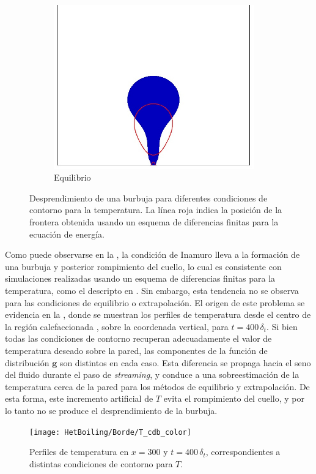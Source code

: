 \begin{figure}[htb]
    \begin{subfigure}[t]{0.45\textwidth}
        \centering
        \includegraphics[width=0.95\textwidth]{Imagenes/HetBoiling/Borde/density_equilibrium_fd}
        \caption{Equilibrio}
    \end{subfigure}    
    \caption{Desprendimiento de una burbuja para diferentes condiciones de contorno para la temperatura. La l\'inea roja indica la posici\'on de la frontera obtenida usando un esquema de diferencias finitas para la ecuaci\'on de energ\'ia.}
    \label{fig:bubble2D_bnd}
\end{figure}

Como puede observarse en la , la condici\'on de Inamuro lleva a la formaci\'on de una burbuja y posterior rompimiento del cuello, lo cual es consistente con simulaciones realizadas usando un esquema de diferencias finitas para la temperatura, como el descripto en \cite{li_lattice_2015}. Sin embargo, esta tendencia no se observa para las condiciones de equilibrio o extrapolaci\'on. El origen de este problema se evidencia en la , donde se muestran los perfiles de temperatura desde el centro de la regi\'on calefaccionada , sobre la coordenada vertical, para $t=400\,\delta_t$. Si bien todas las condiciones de contorno recuperan adecuadamente el valor de temperatura deseado sobre la pared, las componentes de la funci\'on de distribuci\'on $\bm{g}$ son distintos en cada caso. Esta diferencia se propaga hacia el seno del fluido durante el paso de \emph{streaming}, y conduce a una sobreestimaci\'on de la temperatura cerca de la pared para los m\'etodos de equilibrio y extrapolaci\'on. De esta forma, este incremento artificial de $T$ evita el rompimiento del cuello, y por lo tanto no se produce el desprendimiento de la burbuja.
\begin{figure}[ht]
	\centering
	\texttt{[image: HetBoiling/Borde/T\_cdb\_color]}
	\caption{Perfiles de temperatura en $x=300$ y $t=400\,\delta_t$, correspondientes a distintas condiciones de contorno para $T$.}
	\label{fig:hetb_T_cdb}
\end{figure}


